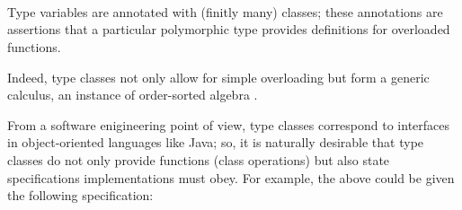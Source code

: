 \begin{isabellebody}
\begin{isamarkuptext}
  \medskip\noindent\hspace*{2ex} \\
  \hspace*{4ex}

  \medskip\noindent\hspace*{2ex} \\
  \hspace*{4ex} \\
  \hspace*{4ex}

  \medskip Type variables are annotated with (finitly many) classes;
  these annotations are assertions that a particular polymorphic type
  provides definitions for overloaded functions.

  Indeed, type classes not only allow for simple overloading
  but form a generic calculus, an instance of order-sorted
  algebra \cite{Nipkow-Prehofer:1993,Nipkow:1993,Wenzel:1997}.

  From a software enigineering point of view, type classes
  correspond to interfaces in object-oriented languages like Java;
  so, it is naturally desirable that type classes do not only
  provide functions (class operations) but also state specifications
  implementations must obey.  For example, the 
  above could be given the following specification:

  \medskip\noindent\hspace*{2ex} \\
  \hspace*{4ex} \\
  \hspace*{2ex} \\
  \hspace*{4ex} \\
  \hspace*{4ex} \\
  \hspace*{4ex}


\end{isamarkuptext}
\end{isabellebody}
